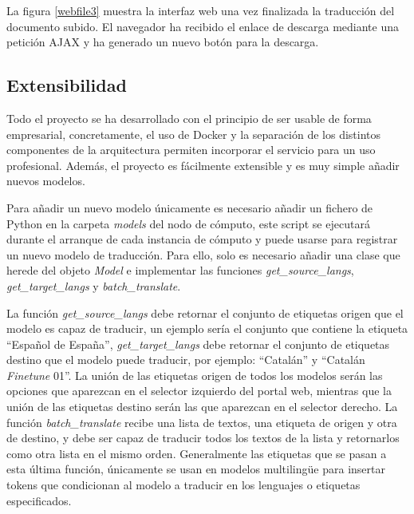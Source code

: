 La figura \ref{webfile3} muestra la interfaz web una vez finalizada la traducción del documento subido. El navegador ha recibido el enlace de descarga mediante una petición AJAX y ha generado un nuevo botón para la descarga.

\subsection{Extensibilidad}\label{funcextensibility}
Todo el proyecto se ha desarrollado con el principio de ser usable de forma empresarial, concretamente, el uso de Docker y la separación de los distintos componentes de la arquitectura permiten incorporar el servicio para un uso profesional. Además, el proyecto es fácilmente extensible y es muy simple añadir nuevos modelos.

Para añadir un nuevo modelo únicamente es necesario añadir un fichero de Python en la carpeta \textit{models} del nodo de cómputo, este script se ejecutará durante el arranque de cada instancia de cómputo y puede usarse para registrar un nuevo modelo de traducción. Para ello, solo es necesario añadir una clase que herede del objeto \textit{Model} e implementar las funciones \textit{get\_source\_langs}, \textit{get\_target\_langs} y \textit{batch\_translate}.

La función \textit{get\_source\_langs} debe retornar el conjunto de etiquetas origen que el modelo es capaz de traducir, un ejemplo sería el conjunto que contiene la etiqueta ``Español de España'', \textit{get\_target\_langs} debe retornar el conjunto de etiquetas destino que el modelo puede traducir, por ejemplo: ``Catalán'' y ``Catalán \textit{Finetune} 01''.
La unión de las etiquetas origen de todos los modelos serán las opciones que aparezcan en el selector izquierdo del portal web, mientras que la unión de las etiquetas destino serán las que aparezcan en el selector derecho.
La función \textit{batch\_translate} recibe una lista de textos, una etiqueta de origen y otra de destino, y debe ser capaz de traducir todos los textos de la lista y retornarlos como otra lista en el mismo orden. Generalmente las etiquetas que se pasan a esta última función, únicamente se usan en modelos multiling{\"u}e para insertar tokens que condicionan al modelo a traducir en los lenguajes o etiquetas especificados.
